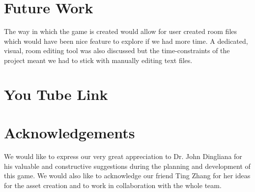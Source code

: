 \documentclass[11pt]{article}
\begin{document}
\section{Future Work}

The way in which the game is created would allow for user created room files which would have been nice feature to explore if we had more time. A dedicated, visual, room editing tool was also discussed but the time-constraints of the project meant we had to stick with manually editing text files. 

\section{You Tube Link}

\section{Acknowledgements}
We would like to express our very great appreciation to Dr. John Dingliana for his valuable and constructive suggestions during the planning and development of this game. We would also like to acknowledge our friend Ting Zhang for her ideas for the asset creation and to work in collaboration with the whole team.  
\end{document}
